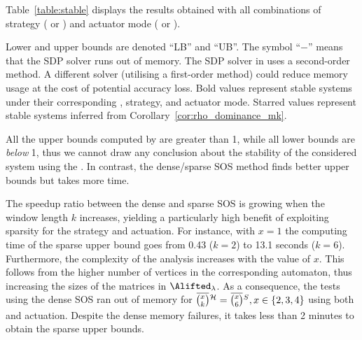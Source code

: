 Table~\ref{table:stable} displays the results obtained with all combinations of strategy (\tK{} or \tS{}) and actuator mode (\tZ{} or \tH{}).

Lower and upper bounds are denoted ``LB'' and ``UB''. 
The symbol ``$-$'' means that the SDP solver runs out of memory.
The SDP solver in  uses a second-order method.
A different solver (utilising a first-order method) could reduce memory usage at the cost of potential accuracy loss.
Bold values represent stable systems under their corresponding \ewhc{}, strategy, and actuator mode.
Starred values represent stable systems inferred from Corollary~\ref{cor:rho_dominance_mk}.

All the upper bounds computed by  are greater than 1, while all lower bounds are \emph{below} 1, thus we cannot draw any conclusion about the stability of the considered system using the .
In contrast, the dense/sparse SOS method finds better upper bounds but takes more time.

The speedup ratio between the dense and sparse SOS is growing when the window length $k$ increases, yielding a particularly high benefit of exploiting sparsity for the \tS{} strategy and \tZ{} actuation.
For instance, with $x=1$ the computing time of the sparse upper bound goes from 0.43 ($k=2$) to 13.1 seconds ($k=6$).
%
Furthermore, the complexity of the analysis increases with the value of $x$.
This follows from the higher number of vertices in the corresponding automaton, thus increasing the sizes of the matrices in $\Alifted_{\lambda}$. 
%
As a consequence, the tests using the dense SOS ran out of memory for $\eanymiss{}{\strat} = \overbar{\binom{x}{6}}^{S}, x \in \left\{ 2, 3, 4 \right\}$ using both \tH{} and \tZ{} actuation.
Despite the dense memory failures, it takes less than 2 minutes to obtain the sparse upper bounds.


